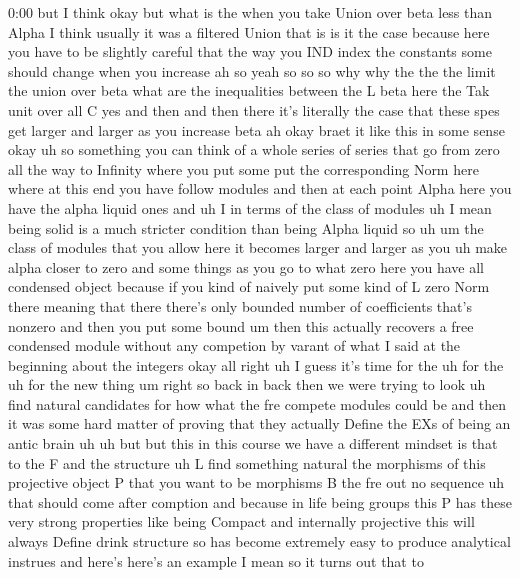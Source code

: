\begin{unfinished}{0:00}
but  I  think  okay  but  what  is  the  when
you  take  Union  over  beta  less  than  Alpha
I  think  usually  it  was  a  filtered  Union
that  is  is  it  the  case  because  here  you
have  to  be  slightly  careful  that  the  way
you  IND  index  the  constants  some  should
change  when  you  increase  ah  so  yeah  so
so  so  why  why  the  the  the  limit  the
union  over  beta  what  are  the
inequalities  between  the  L  beta  here  the
Tak  unit  over  all  C  yes  and  then  and
then  there  it's  literally  the  case  that
these  spes  get  larger  and  larger  as  you
increase
beta
ah  okay  braet  it  like  this  in  some
sense
okay  uh
so  something  you  can  think  of  a  whole
series  of  series  that  go  from  zero  all
the  way  to  Infinity  where  you  put  some
put  the  corresponding  Norm  here  where  at
this  end  you  have  follow  modules  and
then  at  each  point  Alpha  here  you  have
the  alpha  liquid  ones
and  uh  I  in  terms  of  the  class  of
modules  uh  I  mean  being  solid  is  a  much
stricter  condition  than  being  Alpha
liquid  so
uh  um  the  class  of  modules  that  you
allow  here  it  becomes  larger  and  larger
as  you  uh  make  alpha  closer  to  zero  and
some  things  as  you  go  to  what  zero  here
you  have  all  condensed
object  because  if  you  kind  of  naively
put  some  kind  of  L  zero  Norm  there
meaning  that  there  there's  only  bounded
number  of  coefficients  that's  nonzero
and  then  you  put  some  bound  um  then  this
actually  recovers  a  free  condensed
module  without  any  competion  by  varant
of  what  I  said  at  the  beginning  about
the
integers
okay  all  right  uh  I  guess  it's  time  for
the
uh  for  the  uh  for  the  new  thing
um  right  so  back  in  back  then  we  were
trying  to  look  uh  find  natural
candidates  for  how  what  the  fre  compete
modules  could
be  and  then  it  was  some  hard  matter  of
proving  that  they  actually  Define  the
EXs  of  being  an  antic
brain
uh  uh  but
but  this  in  this
course  we  have  a  different
mindset  is  that  to  the
F  and  the
structure  uh  L  find  something  natural
the  morphisms  of  this  projective  object
P  that  you  want  to  be
morphisms
B  the  fre  out  no  sequence  uh
that
should  come  after
comption
and  because  in  life  being  groups  this  P
has  these  very  strong  properties  like
being  Compact  and  internally
projective  this  will  always  Define  drink
structure  so  has  become  extremely  easy
to  produce  analytical
instrues
and  here's  here's  an
example  I  mean  so  it  turns  out  that  to

\end{unfinished}

